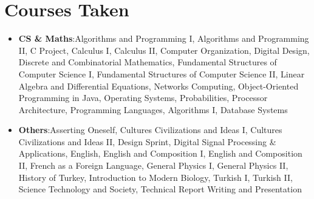 \documentclass[a4paper,11pt]{article}
\newcommand{\resumeItem}[2]{
    \item{\textbf{#1}{:\hspace{0.5mm}#2 \vspace{-0.5mm}}}
}
\newcommand{\resumeSubItem}[2]{\resumeItem{#1}{#2}\vspace{-4pt}}
\newcommand{\resumeHeadingSkillStart}{\begin{itemize}[leftmargin=*,itemsep=1.7mm, rightmargin=2ex]}
\newcommand{\resumeHeadingSkillEnd}{\end{itemize}\vspace{-2mm}}
\begin{document}
\section{\textbf{Courses Taken}}
\resumeHeadingSkillStart
    \resumeSubItem{CS \& Maths}
        {Algorithms and Programming I, Algorithms and Programming II, C Project, Calculus I, Calculus II, Computer Organization, Digital Design, Discrete and Combinatorial Mathematics, Fundamental Structures of Computer Science I, Fundamental Structures of Computer Science II, Linear Algebra and Differential Equations, Networks Computing, Object-Oriented Programming in Java, Operating Systems, Probabilities, Processor Architecture, Programming Languages, Algorithms I, Database Systems}
    \resumeSubItem{Others}
        {Asserting Oneself, Cultures Civilizations and Ideas I, Cultures Civilizations and Ideas II, Design Sprint, Digital Signal Processing \& Applications, English, English and Composition I, English and Composition II, French as a Foreign Language, General Physics I, General Physics II, History of Turkey, Introduction to Modern Biology, Turkish I, Turkish II, 	Science Technology and Society, Technical Report Writing and Presentation}
\resumeHeadingSkillEnd
\vspace{-1mm}

\end{document}
